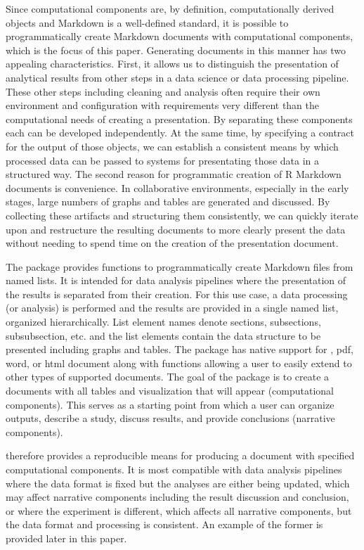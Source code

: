 \documentclass[
]{jss}
\begin{document}
Since computational components are, by definition, computationally
derived objects and  Markdown is a well-defined standard, it
is possible to programmatically create  Markdown documents
with computational components, which is the focus of this paper.
Generating documents in this manner has two appealing characteristics.
First, it allows us to distinguish the presentation of analytical
results from other steps in a data science or data processing pipeline.
These other steps including cleaning and analysis often require their
own environment and configuration with requirements very different than
the computational needs of creating a presentation. By separating these
components each can be developed independently. At the same time, by
specifying a contract for the output of those objects, we can establish
a consistent means by which processed data can be passed to systems for
presentating those data in a structured way. The second reason for
programmatic creation of R Markdown documents is convenience. In
collaborative environments, especially in the early stages, large
numbers of graphs and tables are generated and discussed. By collecting
these artifacts and structuring them consistently, we can quickly
iterate upon and restructure the resulting documents to more clearly
present the data without needing to spend time on the creation of the
presentation document.

The  package provides functions to programmatically create
 Markdown files from named lists. It is intended for data
analysis pipelines where the presentation of the results is separated
from their creation. For this use case, a data processing (or analysis)
is performed and the results are provided in a single named list,
organized hierarchically. List element names denote sections,
subsections, subsubsection, etc. and the list elements contain the data
structure to be presented including graphs and tables. The package has
native support for  \citep{blischak2019}, pdf, word, or
html document along with functions allowing a user to easily extend to
other types of supported documents. The goal of the package is to create
a documents with all tables and visualization that will appear
(computational components). This serves as a starting point from which a
user can organize outputs, describe a study, discuss results, and
provide conclusions (narrative components).

 therefore provides a reproducible means for producing a
document with specified computational components. It is most compatible
with data analysis pipelines where the data format is fixed but the
analyses are either being updated, which may affect narrative components
including the result discussion and conclusion, or where the experiment
is different, which affects all narrative components, but the data
format and processing is consistent. An example of the former is
provided later in this paper.
\end{document}
